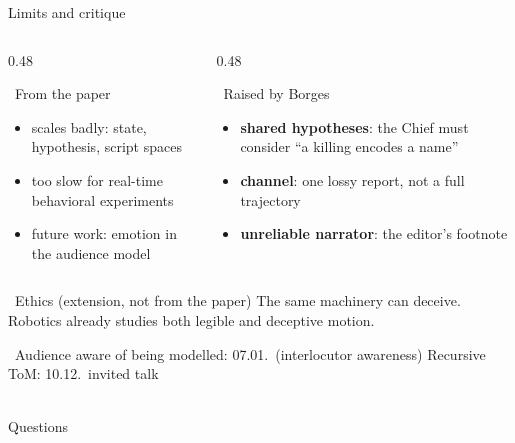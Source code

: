 \documentclass[aspectratio=169,10pt]{beamer}
\newcommand{\seminar}[1]{{\scriptsize\color{gray}\faLink\ #1}}
\newcommand{\tightitem}{\itemsep0.3em}
\newcommand{\slideendspace}{\vspace{0.3em}}
\begin{document}
\begin{frame}{Limits and critique}
\begin{columns}[T,onlytextwidth]

\begin{column}{0.48\textwidth}
\begin{block}{\faExclamationTriangle\ From the paper}
\begin{itemize}\tightitem
  \item scales badly: state, hypothesis, script spaces
  \item too slow for real-time behavioral experiments
  \item future work: emotion in the audience model
\end{itemize}
\end{block}
\end{column}

\begin{column}{0.48\textwidth}
\begin{block}{\faBook\ Raised by Borges}
\begin{itemize}\tightitem
  \item \textbf{shared hypotheses}: the Chief must consider ``a killing encodes a name''
  \item \textbf{channel}: one lossy report, not a full trajectory
  \item \textbf{unreliable narrator}: the editor's footnote
\end{itemize}
\end{block}
\end{column}

\end{columns}

\slideendspace
\begin{alertblock}{\faBalanceScale\ Ethics (extension, not from the paper)}
The same machinery can \alert{deceive}. Robotics already studies both legible and deceptive motion.
\end{alertblock}
\seminar{Audience aware of being modelled: 07.01.\ (interlocutor awareness) \quad Recursive ToM: 10.12.\ invited talk}
\end{frame}

\begin{frame}[standout]
\centering
\faComments\\
Questions
\end{frame}
\end{document}
